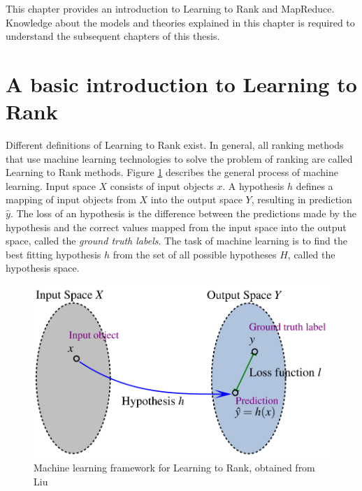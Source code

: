 This chapter provides an introduction to Learning to Rank and MapReduce. Knowledge about the models and theories explained in this chapter is required to understand the subsequent chapters of this thesis.
\section{A basic introduction to Learning to Rank}
Different definitions of Learning to Rank exist. In general, all ranking methods that use machine learning technologies to solve the problem of ranking are called Learning to Rank methods. Figure \ref{fig:discriminative_training} describes the general process of machine learning. Input space $X$ consists of input objects $x$. A hypothesis $h$ defines a mapping of input objects from $X$ into the output space $Y$, resulting in prediction $\hat{y}$. The loss of an hypothesis is the difference between the predictions made by the hypothesis and the correct values mapped from the input space into the output space, called the \emph{ground truth labels}. The task of machine learning is to find the best fitting hypothesis $h$ from the set of all possible hypotheses $H$, called the hypothesis space.\\

\begin{figure}[!h]
\centering
\includegraphics[scale=0.36]{gfx/descriminative_training}
\caption{Machine learning framework for Learning to Rank, obtained from Liu \cite{Liu2007}}
\label{fig:discriminative_training}
\end{figure}

